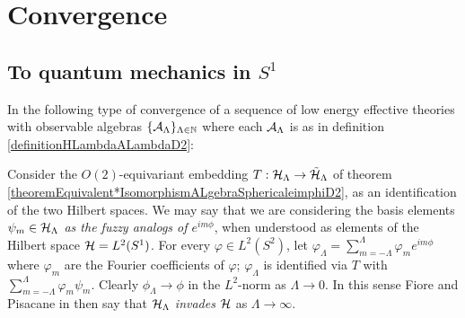 \section{Convergence}

    
    
    
    
    


\subsection{To quantum mechanics in $S^1$}

In \cite{Fiore2018} the following type of convergence of a sequence of low energy effective theories with observable algebras $\{\mathcal A_\Lambda\}_{\Lambda \in \mathbb{N}}$ where each $\mathcal A_\Lambda$ is as in definition \ref{definitionHLambdaALambdaD2}:

Consider the $O(2)$-equivariant embedding $T: \mathcal H_\Lambda \to \tilde {\mathcal H}_\Lambda$ of theorem \ref{theoremEquivalent*IsomorphismALgebraSphericaleimphiD2}, as an identification of the two Hilbert spaces. We may say that we are considering the basis elements \emph{$\psi_m \in \mathcal H_\Lambda$ as the fuzzy analogs of $e^{im\phi}$}, when understood as elements of the Hilbert space $\mathcal H = L^2(S^1)$. For every $\varphi \in L^2(S^2)$, let $\varphi_\Lambda = \sum_{m = -\Lambda}^\Lambda \varphi_m e^{im\phi}$ where $\varphi_m$ are the Fourier coefficients of $\varphi$; $\varphi_\Lambda$ is identified via $T$ with $\sum_{m = -\Lambda}^\Lambda \varphi_m \psi_m$. Clearly $\phi_\Lambda \to \phi$ in the $L^2$-norm as $\Lambda \to 0$. In this sense Fiore and Pisacane in \cite{Fiore2018} then say that $\mathcal H_\Lambda$ \emph{invades} $\mathcal H$ as $\Lambda \to \infty$. 

